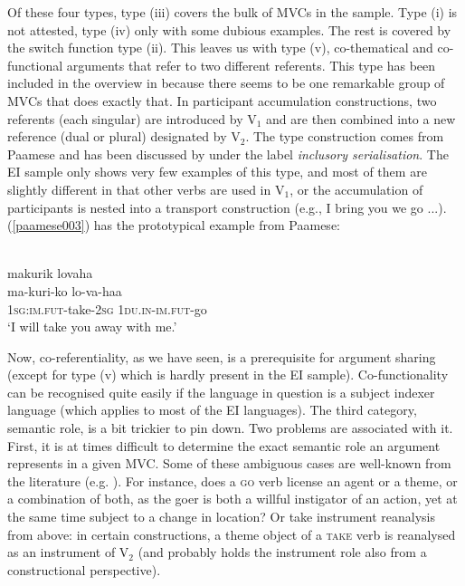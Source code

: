 Of these four types, type (iii) covers the bulk of MVCs in the sample. Type (i) is not attested, type (iv) only with some dubious examples. The rest is covered by the switch function type (ii). This leaves us with type (v), co-thematical and co-functional arguments that refer to two different referents. This type has been included in the overview in  because there seems to be one remarkable group of MVCs that does exactly that. In participant accumulation constructions, two referents (each singular) are introduced by V$_1$ and are then combined into a new reference (dual or plural) designated by V$_2$. The type construction comes from Paamese and has been discussed by \citet[41]{crowley2002serial} under the label \textit{inclusory serialisation}. The EI sample only shows very few examples of this type, and most of them are slightly different in that other verbs are used in V$_1$, or the accumulation of participants is nested into a transport construction (e.g., I bring you we go ...). (\ref{paamese003}) has the prototypical example from Paamese:

\ea \label{paamese003}
\\
\glll makurik lovaha \\
ma-kuri-ko lo-va-haa \\
1\textsc{sg}:\textsc{im}.\textsc{fut}-take-2\textsc{sg} 1\textsc{du}.\textsc{in}-\textsc{im}.\textsc{fut}-go \\
\glft `I will take you away with me.'\\ 
\z

Now, co-referentiality, as we have seen, is a prerequisite for argument sharing (except for type (v) which is hardly present in the EI sample). Co-functionality can be recognised quite easily if the language in question is a subject indexer language (which applies to most of the EI languages). The third category, semantic role, is a bit trickier to pin down. Two problems are associated with it. First, it is at times difficult to determine the exact semantic role an argument represents in a given MVC. Some of these ambiguous cases are well-known from the literature (e.g. \citealt{Dowty1979, Jackendoff1990, van1997syntax}). For instance, does a \textsc{go} verb license an agent or a theme, or a combination of both, as the goer is both a willful instigator of an action, yet at the same time subject to a change in location? Or take instrument reanalysis from above: in certain constructions, a theme object of a \textsc{take} verb is reanalysed as an instrument of V$_2$ (and probably holds the instrument role also from a constructional perspective). 

